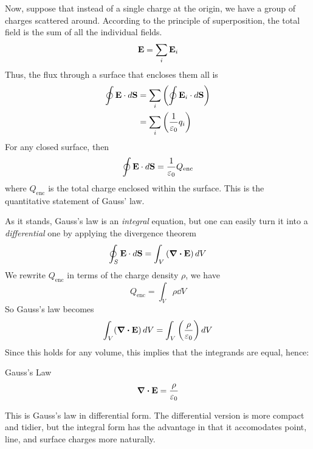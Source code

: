 		Now, suppose that instead of a single charge at the origin, we have a group
		of charges scattered around. According to the principle of superposition,
		the total field is the sum of all the individual fields.
		\[
			\vb{E} = \sum_i \vb{E}_i
		\]
		Thus, the flux through a surface that encloses them all is 
		\begin{align*}
			\oint \vb{E}\cdot\dd{\vb S} 
			&= \sum_i \pqty{\oint \vb{E}_i \cdot \dd{\vb S}}\\
			&= \sum_i \pqty{\frac{1}{\varepsilon_0}q_i}
		\end{align*}
		For any closed surface, then
		\begin{equation}
			\oint\vb{E}\cdot\dd{\vb S} = \frac{1}{\varepsilon_0}Q_\text{enc} 
		\end{equation}
		where $Q_\text{enc}$ is the total charge enclosed within the surface. This is the 
		quantitative statement of Gauss' law.

		As it stands, Gauss's law is an \textit{integral} equation, but one can easily
		turn it into a \textit{differential} one by applying the divergence theorem
		\begin{equation}
		    \oint_S \vb{E}\cdot \dd{\vb S} = \int_V\pqty{\div\vb{E}}\dd{V}
		\end{equation}
		We rewrite $Q_\text{enc}$ in terms of the charge density $\rho$, we have
		\begin{equation}
			Q_\text{enc} = \int_V \rho \dd{V}
		\end{equation}
		So Gauss's law becomes
		\begin{equation}
			\int_V (\div\vb E)\dd{V} = \int_V \pqty{\frac{\rho}{\varepsilon_0}}\dd{V}
		\end{equation}
		Since this holds for any volume, this implies that the integrands are equal, hence:
		\begin{theorem}{Gauss's Law}
			\begin{equation}
				\div\vb E = \frac{\rho}{\varepsilon_0} 
			\end{equation}
		\end{theorem}
		This is Gauss's law in differential form. The differential version is more compact and tidier,
		but the integral form has the advantage in that it accomodates point, line, and surface charges
		more naturally.

